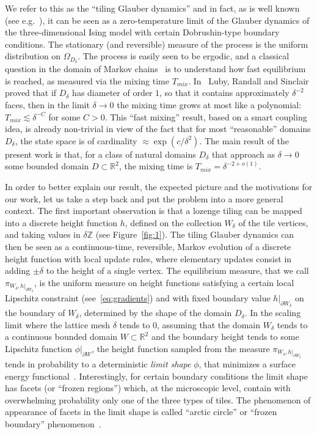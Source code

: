 \documentclass[AHL,Unicode,longabstracts,published]{cedram}
\newcommand{\R}{\mathbb{R}}
\newcommand{\Z}{\mathbb{Z}}
\begin{document}
We refer to this as the ``tiling Glauber dynamics'' and in fact, as is well known (see e.g.~\cite{CMT}), it can be seen as a zero-temperature limit of the Glauber dynamics of the three-dimensional Ising model with certain Dobrushin-type boundary conditions. The stationary (and reversible) measure of the process is the uniform distribution on $\Omega_{D_\delta}$. The process is easily seen to be ergodic, and a classical question in the domain of Markov chains~\cite{LP} is to understand how fast equilibrium is reached, as measured via the mixing time $T_{mix}$. In~\cite{LRS} Luby, Randall and Sinclair proved that if $D_\delta$ has diameter of order $1$, so that it contains approximately $\delta^{-2}$ faces, then in the limit $\delta\to0$ the mixing time grows at most like a polynomial: $T_{mix}\lesssim
\delta^{-C}$ for some $C>0$. This ``fast mixing'' result, based on a smart coupling idea, is already non-trivial in view of the fact that for most ``reasonable'' domains $D_\delta$, the state space is of cardinality $\approx \exp(c/\delta^{2})$. The main result of the present work is that, for a class of natural domains $D_\delta$ that approach as $\delta\to0$ some bounded domain $D\subset \R^2$, the mixing time is $T_{mix}=\delta^{-2+o(1)}$.

In order to better explain our result, the expected picture and the motivations for our work, let us take a step back and put the problem into a more general context. The first important observation is that a lozenge tiling can be mapped into a discrete height function $h$, defined on the collection $W_\delta$ of the tile vertices, and taking values in $\delta\Z$ (see Figure~\ref{fig:1}). The tiling Glauber dynamics can then be seen as a continuous-time, reversible, Markov evolution of a discrete height function with local update rules, where elementary updates consist in adding $\pm \delta$ to the height of a single vertex. The equilibrium measure, that we call $\pi_{W_\delta,h|_{\partial W_\delta}}$, is the uniform measure on height functions satisfying a certain local Lipschitz constraint (see~\eqref{eq:gradients}) and with fixed boundary value $h|_{\partial W_\delta}$ on the boundary of $W_\delta$, determined by the shape of the domain $D_\delta$. In the scaling limit where the lattice mesh $\delta$ tends to $0$, assuming that the domain $W_\delta$ tends to a continuous bounded domain $W\subset \R^2$ and the boundary height tends to some Lipschitz function $\phi|_{\partial W}$, the height function sampled from the measure $\pi_{W_\delta,h|_{\partial W_\delta}}$ tends in probability to a deterministic \emph{limit shape} $\phi$, that minimizes a surface energy functional~\cite{CKP,CLP}. Interestingly, for certain boundary conditions the limit shape has facets (or ``frozen regions'') which, at the microscopic level, contain with overwhelming probability only one of the three types of tiles. The phenomenon of appearance of facets in the limit shape is called ``arctic circle'' or ``frozen boundary'' phenomenon~\cite{CKP,CLP,KO}.
\end{document}
